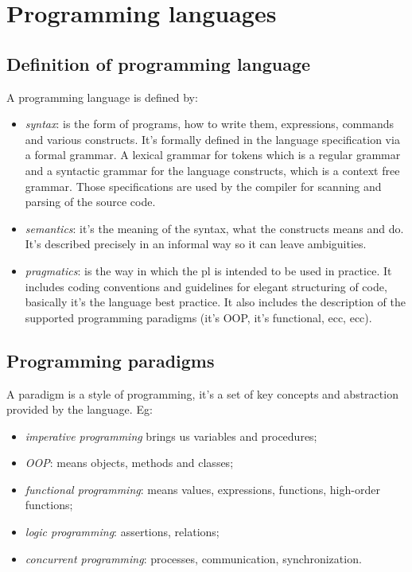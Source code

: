 \section{Programming languages}
\subsection{Definition of programming language}
A programming language is defined by:
\begin{itemize}
    \item \emph{syntax}: is the form of programs, how to write them, expressions, commands and various constructs.
    It's formally defined in the language specification via a formal grammar.
    A lexical grammar for tokens which is a regular grammar and a syntactic grammar for the language constructs, which is a context free grammar.
    Those specifications are used by the compiler for scanning and parsing of the source code.

    \item \emph{semantics}: it's the meaning of the syntax, what the constructs means and do.
    It's described precisely in an informal way so it can leave ambiguities.    

    \item \emph{pragmatics}: is the way in which the pl is intended to be used in practice. It includes coding conventions and guidelines for elegant structuring of code, basically it's the language best practice.
    It also includes the description of the supported programming paradigms (it's OOP, it's functional, ecc, ecc).
\end{itemize}

\subsection{Programming paradigms}
A paradigm is a style of programming, it's a set of key concepts and abstraction provided by the language.
Eg:
\begin{itemize}
    \item \emph{imperative programming} brings us variables and procedures;
    \item \emph{OOP}: means objects, methods and classes;
    \item \emph{functional programming}: means values, expressions, functions, high-order functions;
    \item \emph{logic programming}: assertions, relations;
    \item \emph{concurrent programming}: processes, communication, synchronization.
\end{itemize}

